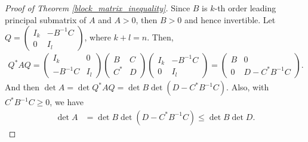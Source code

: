 \documentclass[11pt]{book}
\theoremstyle{definition}
\numberwithin{equation}{chapter}
\begin{document}
\begin{proof}[Proof of Theorem \ref{block_matrix_inequality}]
Since $B$ is $k$-th order leading principal submatrix of $A$ and $A > 0$, then $B > 0$ and hence invertible. Let $Q = \begin{pmatrix} I_k & -B^{-1}C \\ 0 & I_l \end{pmatrix}$, where $k + l = n$. Then,
\begin{align*}
    Q^* A Q = \begin{pmatrix} I_k & 0 \\ -B^{-1}C & I_l \end{pmatrix} \begin{pmatrix} B & C \\ C^* & D \end{pmatrix} \begin{pmatrix} I_k & -B^{-1}C \\ 0 & I_l \end{pmatrix} = \begin{pmatrix} B & 0 \\ 0 & D - C^*B^{-1}C \end{pmatrix}.
\end{align*}
And then $\det A = \det Q^* A Q = \det B \det (D - C^*B^{-1}C)$. Also, with $C^*B^{-1}C \geq 0$, we have
\begin{align*}
    \det A & = \det B \det (D - C^*B^{-1}C) \leq \det B \det D.
\end{align*}
\end{proof}
\end{document}
